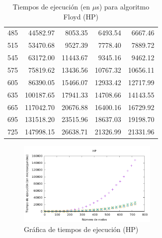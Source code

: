 \documentclass{homework}
\begin{document}
\begin{table}[H]
\begin{tabular}{|r|r|r|r|r|}
            485 & 44582.97 & 8053.35 & 6493.54 & 6667.46 \\ 
            515 & 53470.68 & 9527.39 & 7778.40 & 7889.72 \\ 
            545 & 63172.00 & 11443.67 & 9345.16 & 9462.12 \\ 
            575 & 75819.62 & 13436.56 & 10767.32 & 10656.11 \\ 
            605 & 86390.05 & 15466.07 & 12933.42 & 12717.99 \\ 
            635 & 100187.65 & 17941.33 & 14708.66 & 14143.55 \\ 
            665 & 117042.70 & 20676.88 & 16400.16 & 16729.92 \\ 
            695 & 131518.20 & 23515.96 & 18637.03 & 19198.70 \\ 
            725 & 147998.15 & 26638.71 & 21326.99 & 21331.96 \\ 
            \hline
        \end{tabular}
        \caption{Tiempos de ejecución (en $\mu$s) para algoritmo Floyd (HP)}
    \end{table}

    \begin{figure}[H]
        \centering
        \includegraphics[width=0.6\textwidth]{../data/hp_opt.pdf}
        \caption{Gráfica de tiempos de ejecución (HP)}
    \end{figure}
\end{document}
